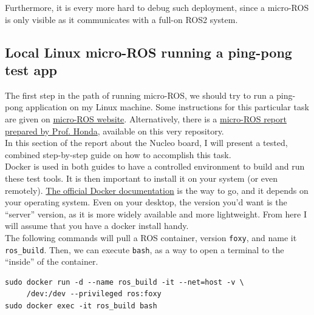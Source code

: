 \documentclass[10pt]{article}
\begin{document}
Furthermore, it is every more hard to debug such deployment, since a micro-ROS is only visible as it communicates with a full-on ROS2 system.

\subsection{Local Linux micro-ROS running a ping-pong test app}
\label{sec:local-linux-micro}
The first step in the path of running micro-ROS, we should try to run a ping-pong application on my Linux machine.
Some instructions for this particular task are given on \href{https://micro.ros.org/docs/tutorials/core/first_application_linux/}{micro-ROS website}.
Alternatively, there is a \href{}{micro-ROS report prepared by Prof. Honda}, available on this very repository.\\

In this section of the report about the Nucleo board, I will present a tested, combined step-by-step guide on how to accomplish this task.\\

Docker is used in both guides to have a controlled environment to build and run these test tools.
It is then important to install it on your system (or even remotely). \href{https://docs.docker.com/engine/install/}{The official Docker documentation} is the way to go, and it depends on your operating system. Even on your desktop, the version you'd want is the ``server'' version, as it is more widely available and more lightweight. From here I will assume that you have a docker install handy.\\


The following commands will pull a ROS container, version \verb|foxy|, and name it \verb|ros_build|.
Then, we can execute \verb|bash|, as a way to open a terminal to the ``inside'' of the container.
\begin{tcolorbox}
\begin{verbatim}
sudo docker run -d --name ros_build -it --net=host -v \
     /dev:/dev --privileged ros:foxy
sudo docker exec -it ros_build bash
\end{verbatim}
\end{tcolorbox}
\end{document}
